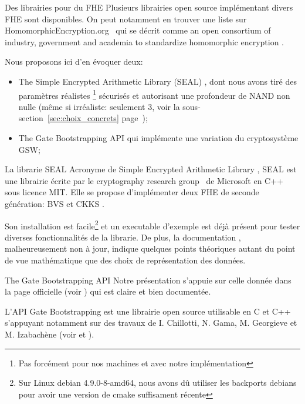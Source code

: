 \begin{section}{Des librairies pour du FHE}
Plusieurs librairies open source implémentant divers FHE sont disponibles. 
On peut notamment en trouver une liste sur HomomorphicEncryption.org~\cite{homencrypt.org}
qui se décrit comme \og an open consortium of industry, government and academia to 
standardize homomorphic encryption \fg.

Nous proposons ici d'en évoquer deux:
\begin{itemize}
\item The Simple Encrypted Arithmetic Library (SEAL) \cite{seal}, dont nous avons tiré des paramètres  
\og réalistes \fg\footnote{Pas forcément pour nos machines et avec notre implémentation}
sécurisés et autorisant une profondeur de NAND non nulle (même si irréaliste: seulement 3, voir la 
sous-section~\ref{sec:choix_concrets} page~\pageref{sec:choix_concrets});
\item The Gate Bootstrapping API \cite{TFHE} qui implémente une variation du cryptosystème GSW;
\end{itemize}

\begin{subsection}{La librarie SEAL}
Acronyme de \og Simple Encrypted Arithmetic Library \fg, SEAL \cite{seal}
est une librairie écrite par le \og cryptography research group \fg \ de Microsoft en C++ sous 
licence MIT. Elle se propose d'implémenter deux FHE de seconde génération: 
BVS \cite{EPRINT:FanVer12} et CKKS \cite{AC:CKKS17}.

Son installation est facile\footnote{Sur Linux debian 4.9.0-8-amd64, nous avons dû
utiliser les backports debians pour avoir une version de cmake suffisament récente}
et un executable d'exemple est déjà présent pour tester diverses fonctionnalités de la librarie. De plus, la
documentation \cite{seal_manual_231}, malheureusement non à jour, indique quelques points théoriques autant du point de
vue mathématique que des choix de représentation des données.
\end{subsection}

\begin{subsection}{The Gate Bootstrapping API}
Notre présentation s'appuie sur celle donnée dans la page officielle (voir \cite{TFHE})
 qui est claire et bien documentée.

L'API Gate Bootstrapping est une librairie open source utilisable en C et C++ s'appuyant notamment sur des travaux de I. Chillotti, N. Gama, M. Georgieve et M. Izabachène 
(voir \cite{cryptoeprint:2016:870} et \cite{cryptoeprint:2017:430}). 


\end{subsection}
\end{section}

